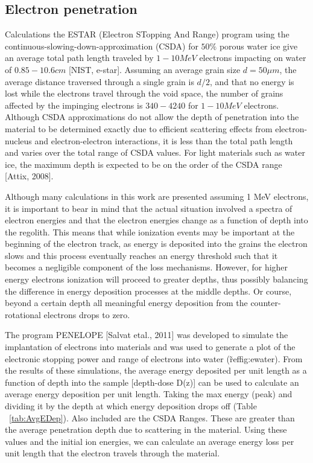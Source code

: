 \documentclass[11pt]{article} %
\begin{document}
\subsection{Electron penetration}
	
	Calculations the ESTAR (Electron STopping And Range) program using the continuous-slowing-down-approximation (CSDA) for $50\%$ porous water ice give an average total path length traveled by $1 - 10 MeV$ electrons impacting on water of $0.85-10.6 cm$  [NIST, e-star]. Assuming an average grain size $d = 50 \mu m$, the average distance traversed through a single grain is $d/2$, and that no energy is lost while the electrons travel through the void space, the number of grains affected by the impinging electrons is $340 - 4240$ for $1-10 MeV$ electrons. Although CSDA approximations do not allow the depth of penetration into the material to be determined exactly due to efficient scattering effects from electron-nucleus and electron-electron interactions, it is less than the total path length and varies over the total range of CSDA values. For light materials such as water ice, the maximum depth is expected to be on the order of the CSDA range [Attix, 2008]. 
	
	 Although many calculations in this work are presented assuming 1 MeV electrons, it is important to bear in mind that the actual situation involved a spectra of electron energies and that the electron energies change as a function of depth into the regolith. This means that while ionization events may be important at the beginning of the electron track, as energy is deposited into the grains the electron slows and this process eventually reaches an energy threshold such that it becomes a negligible component of the loss mechanisms. However, for higher energy electrons ionization will proceed to greater depths, thus possibly balancing the difference in energy deposition processes at the middle depths. Or course, beyond a certain depth all meaningful energy deposition from the counter-rotational electrons drops to zero.  
	 
	 	The program PENELOPE  [Salvat etal., 2011] was developed to simulate the implantation of electrons into materials and was used to generate a plot of the electronic stopping power and range of electrons into water (\~ref{fig:ewater}). From the results of these simulations, the average energy deposited per unit length as a function of depth into the sample [depth-dose D(z)] can be used to calculate an average energy deposition per unit length. Taking the max energy (peak) and dividing it by the depth at which energy deposition drops off (Table ~\ref{tab:AvgEDep}). Also included are the CSDA Ranges. These are greater than the average penetration depth due to scattering in the material. Using these values and the initial ion energies, we can calculate an average energy loss per unit length that the electron travels through the material. 
	 	
\end{document}
